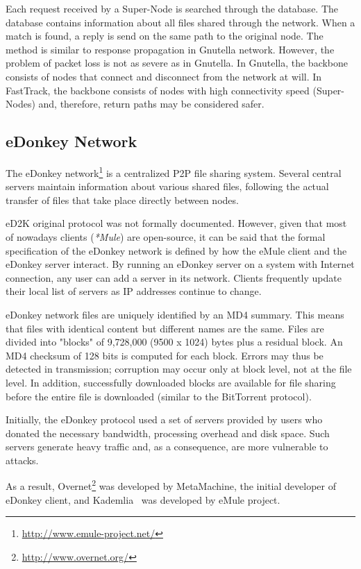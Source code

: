 Each request received by a Super-Node is searched through the database. The
database contains information about all files shared through the network. When
a match is found, a reply is send on the same path to the original node. The
method is similar to response propagation in Gnutella network. However, the
problem of packet loss is not as severe as in Gnutella. In Gnutella, the
backbone consists of nodes that connect and disconnect from the network at
will. In FastTrack, the backbone consists of nodes with high connectivity
speed (Super-Nodes) and, therefore, return paths may be considered safer.

\subsection{eDonkey Network}

The eDonkey network\footnote{\url{http://www.emule-project.net/}} is a centralized P2P file sharing system. Several central
servers maintain information about various shared files, following the actual
transfer of files that take place directly between nodes.

eD2K original protocol was not formally documented. However, given that most
of nowadays clients (\textit{*Mule}) are open-source, it can be said that the
formal specification of the eDonkey network is defined by how the eMule client and
the eDonkey server interact. By running an eDonkey server on a system with
Internet connection, any user can add a server in its network. Clients
frequently update their local list of servers as IP addresses continue to
change.

eDonkey network files are uniquely identified by an MD4 summary. This means
that files with identical content but different names are the same. Files are
divided into "blocks" of 9,728,000 (9500 x 1024) bytes plus a residual block.
An MD4 checksum of 128 bits is computed for each block. Errors may thus be
detected in transmission; corruption may occur only at block level, not
at the file level. In addition, successfully downloaded blocks are available
for file sharing before the entire file is downloaded (similar to the
BitTorrent protocol).

Initially, the eDonkey protocol used a set of servers provided by users who
donated the necessary bandwidth, processing overhead and disk space. Such
servers generate heavy traffic and, as a consequence, are more vulnerable to
attacks.

As a result, Overnet\footnote{\url{http://www.overnet.org/}} was developed by MetaMachine, the initial developer of
eDonkey client, and Kademlia~\cite{kademlia} was developed by eMule project.

